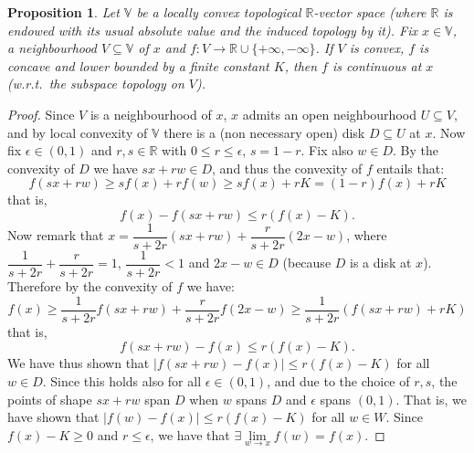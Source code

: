 \documentclass[submission,copyright,creativecommons]{eptcs}
\newtheorem{Proposition}[theorem]{Proposition}
\newcommand{\R}{\mathbb{R}}
\newcommand{\set}[1]{\{#1\}}
\newcommand{\eps}{\epsilon}
\begin{document}
\begin{Proposition}\label{prop:mainLCTVS}
 Let $\mathbb{V}$ be a locally convex topological $\R$-vector space (where $\R$ is endowed with its usual absolute value and the induced topology by it).
 Fix $x\in\mathbb{V}$, a neighbourhood $V\subseteq\mathbb{V}$ of $x$ and $f:V\to \R\cup\set{+\infty,-\infty}$.
 If $V$ is convex, $f$ is concave and lower bounded by a finite constant $K$, then $f$ is continuous at $x$ (w.r.t.\ the subspace topology on $V$).
\end{Proposition}
\begin{proof}
 Since $V$ is a neighbourhood of $x$, $x$ admits an open neighbourhood $U\subseteq V$, and by local convexity of $\mathbb{V}$ there is a (non necessary open) disk $D\subseteq U$ at $x$.
 Now fix $\eps\in(0,1)$ and $r,s\in \R$ with $0\leq r\leq\eps$, $s=1-r$.
 Fix also $w\in D$.
 By the convexity of $D$ we have $sx+rw\in D$, and thus the convexity of $f$ entails that:
 \[
  f(sx+rw)\geq s f(x) + r f(w) \geq s f(x) + r K = (1-r)f(x) + r K
 \]
that is,
 \[
  f(x)-f(sx+rw)\leq r (f(x)-K).
 \]
 Now remark that $x=\dfrac{1}{s+2r}(sx+rw)+\dfrac{r}{s+2r}(2x-w)$, where $\dfrac{1}{s+2r}+\dfrac{r}{s+2r}=1$, $\dfrac{1}{s+2r}<1$ and $2x-w\in D$ (because $D$ is a disk at $x$).
 Therefore by the convexity of $f$ we have:
 \[
  f(x)\geq \dfrac{1}{s+2r}f(sx+rw)+\dfrac{r}{s+2r}f(2x-w)\geq \dfrac{1}{s+2r}(f(sx+rw)+rK)
 \]
 that is,
 \[
  f(sx+rw)-f(x)\leq r(f(x)-K).
 \]
 We have thus shown that $\mid f(sx+rw)-f(x)\mid\leq r(f(x)-K)$ for all $w\in D$.
 Since this holds also for all $\eps\in(0,1)$, and due to the choice of $r,s$, the points of shape $sx+rw$ span $D$ when $w$ spans $D$ and $\eps$ spans $(0,1)$.
 That is, we have shown that $\mid f(w)-f(x)\mid\leq r(f(x)-K)$ for all $w\in W$.
 Since $f(x)-K\geq 0$ and $r\leq \eps$, we have that $\exists\lim\limits_{w\to x} f(w)=f(x)$.
\end{proof}
\end{document}
